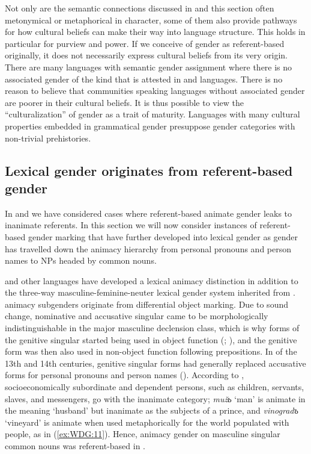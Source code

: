 \documentclass[output=collectionpaper]{langsci/langscibook}
\begin{document}
Not only are the semantic connections discussed in  and this section often metonymical or metaphorical in character, some of them also provide pathways for how cultural beliefs can make their way into language structure. This holds in particular for purview and power. If we conceive of gender as referent-based originally, it does not necessarily express cultural beliefs from its very origin. There are many languages with semantic gender assignment where there is no associated gender of the kind that is attested in  and  languages. There is no reason to believe that communities speaking languages without associated gender are poorer in their cultural beliefs. It is thus possible to view the ``culturalization'' of gender as a trait of maturity. Languages with many cultural properties embedded in grammatical gender presuppose gender categories with non-trivial prehistories.

  \subsection{Lexical gender originates from referent-based gender}
\label{sec:WDG:3.5}

In  and  we have considered cases where referent-based animate gender leaks to inanimate referents. In this section we will now consider instances of referent-based gender marking that have further developed into lexical gender as gender has travelled down the animacy hierarchy from personal pronouns and person names to NPs headed by common nouns.


 and other  languages have developed a lexical animacy distinction in addition to the three-way masculine-feminine-neuter lexical gender system inherited from .  animacy subgenders originate from differential object marking. Due to sound change, nominative and accusative singular came to be morphologically indistinguishable in the major masculine declension class, which is why forms of the genitive singular started being used in object function (\citealt{Meillet1897}; \citealt[206]{Huntley1980}), and the genitive form was then also used in non-object function following prepositions. In  of the 13th and 14th centuries, genitive singular forms had generally replaced accusative forms for personal pronouns and person names (\citealt[263]{Dietze1973}). According to \cite[265]{Dietze1973}, socioeconomically subordinate and dependent persons, such as children, servants, slaves, and messengers, go with the inanimate category; \textit{mužь} `man' is animate in the meaning `husband' but inanimate as the subjects of a prince, and \textit{vinogradъ} `vineyard' is animate when used metaphorically for the world populated with people, as in (\ref{ex:WDG:11}). Hence, animacy gender on masculine singular common nouns was referent-based in .
\end{document}
